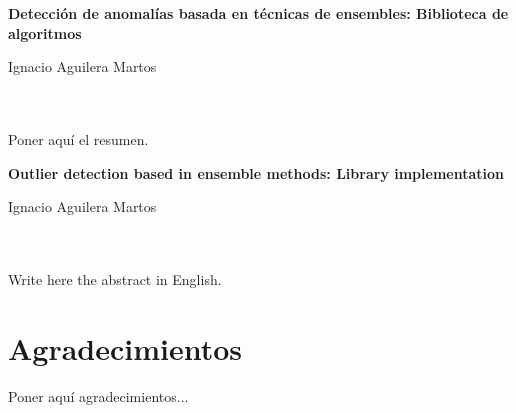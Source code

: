 \chapter*{}






\cleardoublepage
\thispagestyle{empty}

\begin{center}
{\large\bfseries Detección de anomalías basada en técnicas de ensembles: Biblioteca de algoritmos}\\
\end{center}
\begin{center}
Ignacio Aguilera Martos\\
\end{center}

\\

\vspace{0.7cm}
\\

Poner aquí el resumen.
\cleardoublepage


\thispagestyle{empty}


\begin{center}
{\large\bfseries Outlier detection based in ensemble methods: Library implementation}\\
\end{center}
\begin{center}
Ignacio Aguilera Martos\\
\end{center}

\\

\vspace{0.7cm}
\\

Write here the abstract in English.

\chapter*{Agradecimientos}
\thispagestyle{empty}

       \vspace{1cm}


Poner aquí agradecimientos...

